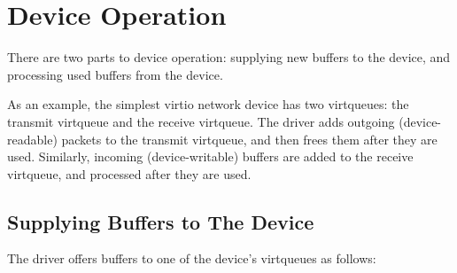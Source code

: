 \section{Device Operation}\label{sec:General Initialization And Device Operation / Device Operation}

There are two parts to device operation: supplying new buffers to
the device, and processing used buffers from the device.

\begin{note} As an
example, the simplest virtio network device has two virtqueues: the
transmit virtqueue and the receive virtqueue. The driver adds
outgoing (device-readable) packets to the transmit virtqueue, and then
frees them after they are used. Similarly, incoming (device-writable)
buffers are added to the receive virtqueue, and processed after
they are used.
\end{note}

\subsection{Supplying Buffers to The Device}\label{sec:General Initialization And Device Operation / Device Operation / Supplying Buffers to The Device}

The driver offers buffers to one of the device's virtqueues as follows:

